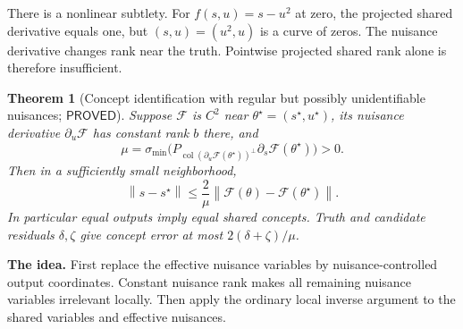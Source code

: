 \documentclass[12pt,a4paper]{article}
\theoremstyle{readable}
\newtheorem{theorem}{Theorem}[section]
\theoremstyle{definition}\newtheorem{example}[theorem]{Example}
\newcommand{\col}{\operatorname{col}}\newcommand{\row}{\operatorname{row}}
\newcommand{\norm}[1]{\left\|#1\right\|}
\newcommand{\PP}{\mathsf{PROVED}}\newcommand{\FF}{\mathsf{FALSE}}
\newcommand{\idea}[1]{\par\textbf{The idea.} #1\par}
\begin{document}
There is a nonlinear subtlety. For \(f(s,u)=s-u^2\) at zero, the projected shared derivative equals one, but \((s,u)=(u^2,u)\) is a curve of zeros. The nuisance derivative changes rank near the truth. Pointwise projected shared rank alone is therefore insufficient.

\begin{theorem}[Concept identification with regular but possibly unidentifiable nuisances; \(\PP\)]\label{thm:sharedregular}
Suppose \(\mathcal F\) is \(C^2\) near \(\theta^\star=(s^\star,u^\star)\), its nuisance derivative \(\partial_u\mathcal F\) has constant rank \(b\) there, and
\[
\mu=\sigma_{\min}\bigl(P_{\col(\partial_u\mathcal F(\theta^\star))^\perp}
\partial_s\mathcal F(\theta^\star)\bigr)>0.
\]
Then in a sufficiently small neighborhood,
\[
\norm{s-s^\star}\le\frac2\mu
\norm{\mathcal F(\theta)-\mathcal F(\theta^\star)}.
\]
In particular equal outputs imply equal shared concepts. Truth and candidate residuals \(\delta,\zeta\) give concept error at most \(2(\delta+\zeta)/\mu\).
\end{theorem}
\idea{First replace the effective nuisance variables by nuisance-controlled output coordinates. Constant nuisance rank makes all remaining nuisance variables irrelevant locally. Then apply the ordinary local inverse argument to the shared variables and effective nuisances.}
\end{document}
